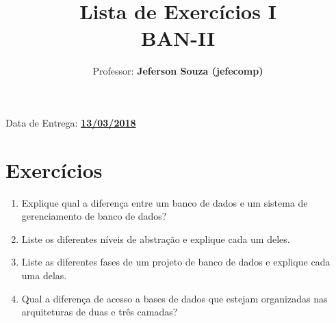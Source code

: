 \documentclass[12pt]{article}
\title{Lista de Exercícios I\\
BAN-II}
\author{Professor: \textbf{Jeferson Souza (jefecomp)}}
\begin{document}
\date{}

\maketitle

\begin{center}
Data de Entrega: \textbf{\underline{13/03/2018}}
\end{center}

\section{Exercícios}

\begin{enumerate}
\itemsep 10mm

\item Explique qual a diferença entre um banco de dados e um sistema de gerenciamento de banco de dados?

\item Liste os diferentes níveis de abstração e explique cada um deles.

\item Liste as diferentes fases de um projeto de banco de dados e explique cada uma delas.

\item Qual a diferença de acesso a bases de dados que estejam organizadas nas arquiteturas de duas e três camadas?

\end{enumerate}
\end{document}
